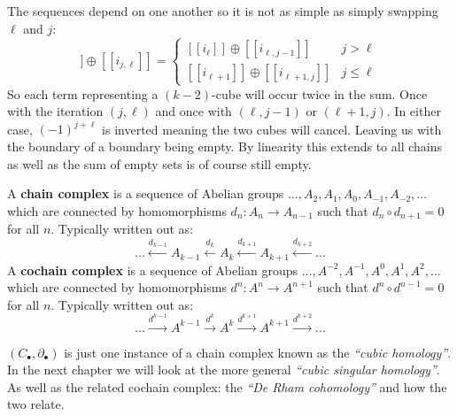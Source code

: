 The sequences depend on one another so it is not as simple as simply swapping $\ell$ and $j$:
\begin{equation}
   [\![i_j]\!] \oplus [\![i_{j,\ell}]\!] =
     \begin{cases}
       [\![i_\ell]\!] \oplus [\![i_{\ell,j-1}]\!] & j > \ell \\
       [\![i_{\ell+1}]\!] \oplus [\![i_{\ell+1,j}]\!] & j \leq \ell
     \end{cases}
\end{equation}
So each term representing a $(k-2)$-cube will occur twice in the sum.
Once with the iteration $(j,\ell)$ and once with $(\ell, j-1)$ or $(\ell+1, j)$.
In either case, $(-1)^{j+\ell}$ is inverted meaning the two cubes will cancel.
Leaving us with the boundary of a boundary being empty.
By linearity this extends to all chains as well as the sum of empty sets is of course still empty.


\begin{definition}
	A \textbf{chain complex} is a sequence of Abelian groups $\ldots, A_2, A_1, A_0, A_{-1}, A_{-2}, \ldots$ \linebreak
	which are connected by homomorphisms $d_n:A_n \to A_{n-1}$ such that $d_n \circ d_{n+1} = 0$ for all $n$.
	Typically written out as:
	\begin{equation}
		\ldots 	\xleftarrow{d_{k-1}} A_{k-1} 
				\xleftarrow{d_{k}} A_k 
				\xleftarrow{d_{k+1}} A_{k+1} 
				\xleftarrow{d_{k+2}} \ldots
	\end{equation}
	A \textbf{cochain complex} is a sequence of Abelian groups $\ldots, A^{-2}, A^{-1}, A^0, A^{1}, A^{2}, \ldots$
	which are connected by homomorphisms $d^n:A^n \to A^{n+1}$ such that $d^n \circ d^{n-1} = 0$ for all $n$.
	Typically written out as:
	\begin{equation}
		\ldots 	\xrightarrow{d^{k-1}} A^{k-1} 
				\xrightarrow{d^{k}} A^k 
				\xrightarrow{d^{k+1}} A^{k+1} 
				\xrightarrow{d^{k+2}} \ldots
	\end{equation}
\end{definition}

$(C_\bullet, \partial_\bullet)$ is just one instance of a chain complex known as the \emph{``cubic homology''}.
In the next chapter we will look at the more general \emph{``cubic singular homology''}.
As well as the related cochain complex: the \emph{``De Rham cohomology''} and how the two relate.
















